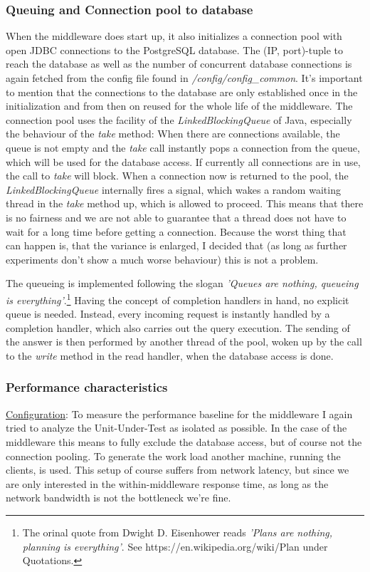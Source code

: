 \documentclass[11pt]{article}
\begin{document}
\subsubsection{Queuing and Connection pool to database}\label{sec:queuing-and-connection-pool-to-database}
When the middleware does start up, it also initializes a connection pool with open JDBC connections to the PostgreSQL database. The (IP, port)-tuple to reach the database as well as the number of concurrent database connections is again fetched from the config file found in \textit{/config/config\_common}. It's important to mention that the connections to the database are only established once in the initialization and from then on reused for the whole life of the middleware. The connection pool uses the facility of the \textit{LinkedBlockingQueue} of Java, especially the behaviour of the \textit{take} method: When there are connections available, the queue is not empty and the \textit{take} call instantly pops a connection from the queue, which will be used for the database access. If currently all connections are in use, the call to \textit{take} will block. When a connection now is returned to the pool, the \textit{LinkedBlockingQueue} internally fires a signal, which wakes a random waiting thread in the \textit{take} method up, which is allowed to proceed. This means that there is no fairness and we are not able to guarantee that a thread does not have to wait for a long time before getting a connection. Because the worst thing that can happen is, that the variance is enlarged, I decided that (as long as further experiments don't show a much worse behaviour) this is not a problem.

The queueing is implemented following the slogan \textit{'Queues are nothing, queueing is everything'}.\footnote{The orinal quote from Dwight D. Eisenhower reads \textit{'Plans are nothing, planning is everything'}. See https://en.wikipedia.org/wiki/Plan under Quotations.} Having the concept of completion handlers in hand, no explicit queue is needed. Instead, every incoming request is instantly handled by a completion handler, which also carries out the query execution. The sending of the answer is then performed by another thread of the pool, woken up by the call to the \textit{write} method in the read handler, when the database access is done.

\subsubsection{Performance characteristics}\label{sec:performance-characteristics-1}
\underline{Configuration}: To measure the performance baseline for the middleware I again tried to analyze the Unit-Under-Test as isolated as possible. In the case of the middleware this means to fully exclude the database access, but of course not the connection pooling. To generate the work load another machine, running the clients, is used. This setup of course suffers from network latency, but since we are only interested in the within-middleware response time, as long as the network bandwidth is not the bottleneck we're fine.
\end{document}
